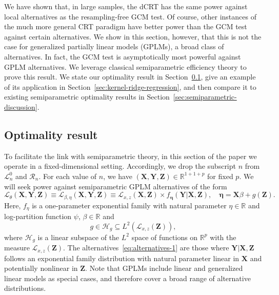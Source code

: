\documentclass[12pt]{article}
\theoremstyle{definition}
\theoremstyle{remark}
\newcommand{\R}{\mathbb{R}}								%
\newcommand{\prx}{\bm X}								%
\newcommand{\prz}{\bm Z}								%
\newcommand{\pry}{{\bm Y}}								%
\newcommand{\law}{\mathcal L}							%
\newcommand{\nulllaws}{\mathscr L^0}					%
\newcommand{\regclass}{\mathscr R}					    %
\renewcommand{\H}{\mathcal H}		 					%
\begin{document}
	We have shown that, in large samples, the dCRT has the same power against local alternatives as the resampling-free GCM test. Of course, other instances of the much more general CRT paradigm have better power than the GCM test against certain alternatives. We show in this section, however, that this is not the case for generalized partially linear models (GPLMs), a broad class of alternatives. In fact, the GCM test is asymptotically most powerful against GPLM alternatives. We leverage classical semiparametric efficiency theory \citep{Choi1996, VDV1998, Kosorok2008} to prove this result. We state our optimality result in Section~\ref{sec:optimality-result}, give an example of its application in Section~\ref{sec:kernel-ridge-regression}, and then compare it to existing semiparametric optimality results in Section~\ref{sec:semiparametric-discussion}.
	
	\subsection{Optimality result} \label{sec:optimality-result}
	
	To facilitate the link with semiparametric theory, in this section of the paper we operate in a fixed-dimensional setting. Accordingly, we drop the subscript $n$ from $\nulllaws_n$ and $\regclass_n$. For each value of $n$, we have $(\prx, \pry, \prz) \in \R^{1 + 1 + p}$ for fixed $p$. We will seek power against semiparametric GPLM alternatives of the form
	\begin{equation}
		\law_{\theta}(\prx, \pry, \prz) \equiv \law_{\beta, \eta}(\prx, \pry, \prz) \equiv \law_{x,z}(\prx, \prz) \times f_{\bm \eta}(\pry|\prx, \prz),\quad \bm \eta = \prx \beta + g(\prz).
		\label{eq:alternatives-1}
	\end{equation}
	Here, $f_\eta$ is a one-parameter exponential family with natural parameter $\eta \in \R$ and log-partition function $\psi$, $\beta \in \R$ and 
	\begin{equation}
		g \in \H_g \subseteq L^2(\law_{x,z}(\bm Z)), 
	\end{equation}
	where $\H_g$ is a linear subspace of the $L^2$ space of functions on $\R^p$ with the measure $\law_{x,z}(\bm Z)$. The alternatives~\eqref{eq:alternatives-1} are those where $\pry|\prx,\prz$ follows an exponential family distribution with natural parameter linear in $\prx$ and potentially nonlinear in $\prz$. Note that GPLMs include linear and generalized linear models as special cases, and therefore cover a broad range of alternative distributions.
	
\end{document}
